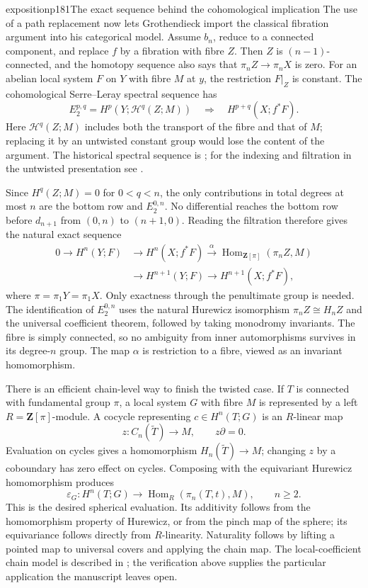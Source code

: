 \begin{dcomment}{exposition}{p181}{The exact sequence behind the cohomological implication}
The use of a path replacement now lets Grothendieck import the classical fibration argument into his categorical model. Assume $b_n$, reduce to a connected component, and replace $f$ by a fibration with fibre $Z$. Then $Z$ is $(n-1)$-connected, and the homotopy sequence also says that $\pi_nZ\to\pi_nX$ is zero. For an abelian local system $F$ on $Y$ with fibre $M$ at $y$, the restriction $F|_Z$ is constant. The cohomological Serre--Leray spectral sequence has
\[
 E_2^{p,q}=H^p(Y;\mathcal H^q(Z;M))
 \quad\Longrightarrow\quad H^{p+q}(X;f^*F).
\]
Here $\mathcal H^q(Z;M)$ includes both the transport of the fibre and that of $M$; replacing it by an untwisted constant group would lose the content of the argument. The historical spectral sequence is \citet[Chapter~II, \S8, Proposition~6]{Serre1951}; for the indexing and filtration in the untwisted presentation see \citet[Theorem~1.14]{HatcherSS2004}.

Since $H^q(Z;M)=0$ for $0<q<n$, the only contributions in total degrees at most $n$ are the bottom row and $E_2^{0,n}$. No differential reaches the bottom row before $d_{n+1}$ from $(0,n)$ to $(n+1,0)$. Reading the filtration therefore gives the natural exact sequence
\[
\begin{split}
0\longrightarrow H^n(Y;F)&\longrightarrow H^n(X;f^*F)
 \xrightarrow{\alpha}\operatorname{Hom}_{\mathbf Z[\pi]}
       (\pi_nZ,M)\\
 &\longrightarrow H^{n+1}(Y;F)
 \longrightarrow H^{n+1}(X;f^*F),
\end{split}
\]
where $\pi=\pi_1Y=\pi_1X$. Only exactness through the penultimate group is needed. The identification of $E_2^{0,n}$ uses the natural Hurewicz isomorphism $\pi_nZ\cong H_nZ$ and the universal coefficient theorem, followed by taking monodromy invariants. The fibre is simply connected, so no ambiguity from inner automorphisms survives in its degree-$n$ group. The map $\alpha$ is restriction to a fibre, viewed as an invariant homomorphism.

There is an efficient chain-level way to finish the twisted case. If $T$ is connected with fundamental group $\pi$, a local system $G$ with fibre $M$ is represented by a left $R=\mathbf Z[\pi]$-module. A cocycle representing $c\in H^n(T;G)$ is an $R$-linear map
\[
 z:C_n(\widetilde T)\longrightarrow M,
 \qquad z\partial=0.
\]
Evaluation on cycles gives a homomorphism $H_n(\widetilde T)\to M$; changing $z$ by a coboundary has zero effect on cycles. Composing with the equivariant Hurewicz homomorphism produces
\[
 \varepsilon_G:H^n(T;G)\longrightarrow
 \operatorname{Hom}_R(\pi_n(T,t),M),\qquad n\geq2.
\]
This is the desired spherical evaluation. Its additivity follows from the homomorphism property of Hurewicz, or from the pinch map of the sphere; its equivariance follows directly from $R$-linearity. Naturality follows by lifting a pointed map to universal covers and applying the chain map. The local-coefficient chain model is described in \citet[\S3H, pp.~327--334]{Hatcher2002}; the verification above supplies the particular application the manuscript leaves open.


\end{dcomment}
